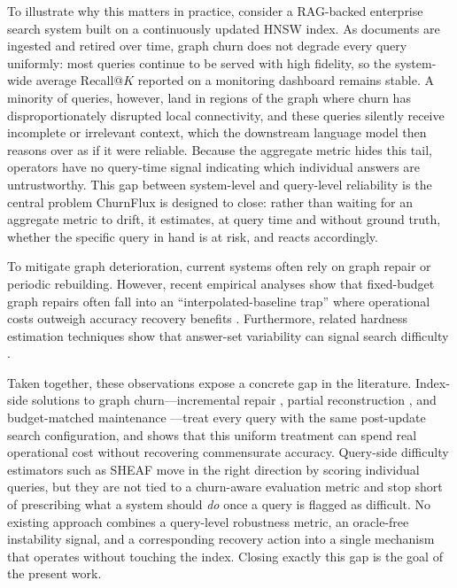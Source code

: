 \documentclass{ieeeaccess}
\begin{document}
To illustrate why this matters in practice, consider a RAG-backed enterprise search system \cite{Lewis2020, RAGSurvey2024} built on a continuously updated HNSW index. As documents are ingested and retired over time, graph churn does not degrade every query uniformly: most queries continue to be served with high fidelity, so the system-wide average Recall@$K$ reported on a monitoring dashboard remains stable. A minority of queries, however, land in regions of the graph where churn has disproportionately disrupted local connectivity, and these queries silently receive incomplete or irrelevant context, which the downstream language model then reasons over as if it were reliable. Because the aggregate metric hides this tail, operators have no query-time signal indicating which individual answers are untrustworthy. This gap between system-level and query-level reliability is the central problem ChurnFlux is designed to close: rather than waiting for an aggregate metric to drift, it estimates, at query time and without ground truth, whether the specific query in hand is at risk, and reacts accordingly.

To mitigate graph deterioration, current systems often rely on graph repair or periodic rebuilding. However, recent empirical analyses show that fixed-budget graph repairs often fall into an ``interpolated-baseline trap'' where operational costs outweigh accuracy recovery benefits \cite{Mandarapu2026}. Furthermore, related hardness estimation techniques show that answer-set variability can signal search difficulty \cite{Sheaf2026}.

Taken together, these observations expose a concrete gap in the literature. Index-side solutions to graph churn---incremental repair \cite{Xu2025, CleanNN2025}, partial reconstruction \cite{DiskANN2020, FreshDiskANN2022}, and budget-matched maintenance \cite{Mandarapu2026}---treat every query with the same post-update search configuration, and \cite{Mandarapu2026} shows that this uniform treatment can spend real operational cost without recovering commensurate accuracy. Query-side difficulty estimators such as SHEAF \cite{Sheaf2026} move in the right direction by scoring individual queries, but they are not tied to a churn-aware evaluation metric and stop short of prescribing what a system should \emph{do} once a query is flagged as difficult. No existing approach combines a query-level robustness metric, an oracle-free instability signal, and a corresponding recovery action into a single mechanism that operates without touching the index. Closing exactly this gap is the goal of the present work.
\end{document}
